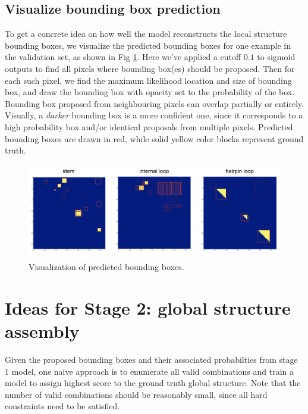 \documentclass[12pt]{article}
\begin{document}
\subsection{Visualize bounding box prediction}

To get a concrete idea on how well the model reconstructs the local structure bounding boxes,
we visualize the predicted bounding boxes for one example in the validation set, as shown in Fig \ref{fig:visualize_bb_prediction}.
Here we've applied a cutoff $0.1$ to sigmoid outputs to find all pixels where bounding box(es) should be proposed.
Then for each such pixel, we find the maximum likelihood location and size of bounding box,
and draw the bounding box with opacity set to the probability of the box.
Bounding box proposed from neighbouring pixels can overlap partially or entirely.
Visually, a \textit{darker} bounding box is a more confident one,
since it corresponds to a high probability box and/or identical proposals from multiple pixels.
Predicted bounding boxes are drawn in red, while solid yellow color blocks represent ground truth.

\begin{figure}[h]
    \centering
    \includegraphics[width=\textwidth]{plot/visualize_bb_prediction.png}
    \caption{Visualization of predicted bounding boxes.}
    \label{fig:visualize_bb_prediction}
    \centering
\end{figure}



\section{Ideas for Stage 2: global structure assembly}

Given the proposed bounding boxes and their associated probabilties from stage 1 model,
one naive approach is to enumerate all valid combinations and train a model to assign
highest score to the ground truth global structure.
Note that the number of valid combinations should be reasonably small, since all hard
constraints need to be satisfied.
\end{document}
